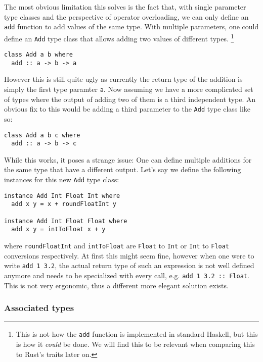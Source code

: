 The most obvious limitation this solves is the fact that, with single parameter type classes and the perspective of operator overloading, we can only define an \verb|add| function to add values of the same type. With multiple parameters, one could define an \verb|Add| type class that allows adding two values of different types.
\footnote{This is not how the \verb|add| function is implemented in standard Haskell, but this is how it \textit{could} be done. We will find this to be relevant when comparing this to Rust's traits later on.}
\begin{verbatim}
class Add a b where
  add :: a -> b -> a
\end{verbatim}

However this is still quite ugly as currently the return type of the addition is simply the first type paramter \verb|a|. Now assuming we have a more complicated set of types where the output of adding two of them is a third independent type. An obvious fix to this would be adding a third parameter to the \verb|Add| type class like so:
\begin{verbatim}
class Add a b c where
  add :: a -> b -> c
\end{verbatim}

While this works, it poses a strange issue: One can define multiple additions for the same type that have a different output. Let's say we define the following instances for this new \verb|Add| type class:
\begin{verbatim}
instance Add Int Float Int where
  add x y = x + roundFloatInt y

instance Add Int Float Float where
  add x y = intToFloat x + y
\end{verbatim}
where \verb|roundFloatInt| and \verb|intToFloat| are \verb|Float| to \verb|Int| or \verb|Int| to \verb|Float| conversions respectively. At first this might seem fine, however when one were to write \verb|add 1 3.2|, the actual return type of such an expression is not well defined anymore and needs to be specialized with every call, e.g. \verb|add 1 3.2 :: Float|. This is not very ergonomic, thus a different more elegant solution exists.


\subsubsection{Associated types}


